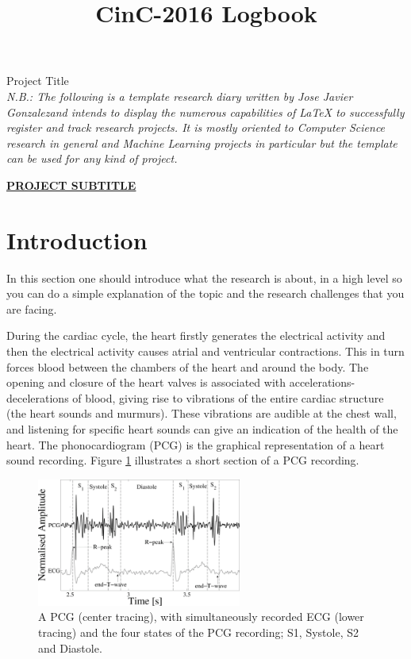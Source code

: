 \documentclass[11pt,letterpaper]{article}
\newcommand{\userName}{Jose Javier Gonzalez}
\begin{document}
\title{CinC-2016 Logbook}
\univlogo
{\Huge Project Title}\\[5mm]

\textit{N.B.: The following is a template research diary written by \userName and intends to display the numerous capabilities of LaTeX to successfully register and track research projects. It is mostly oriented to Computer Science research in general and  Machine Learning projects in particular but the template can be used for any kind of project.}

\vspace{1em}
{\large \underline{\textbf{\uppercase{PROJECT SUBTITLE}}}}

\section*{Introduction} %
\label{sec:introduction}
\begin{tip}
In this section one should introduce what the research is about, in a high level so you can do a simple explanation of the topic and the research challenges that you are facing.
\end{tip}

During the cardiac cycle, the heart firstly generates the electrical activity and then the electrical activity causes atrial and ventricular contractions. This in turn forces blood between the chambers of the heart and around the body. The opening and closure of the heart valves is associated with accelerations-decelerations of blood, giving rise to vibrations of the entire cardiac structure (the heart sounds and murmurs). These vibrations are audible at the chest wall, and listening for specific heart sounds can give an indication of the health of the heart. The phonocardiogram (PCG) is the graphical representation of a heart sound recording. Figure \ref{fig:PCG_ECG} illustrates a short section of a PCG recording.

\begin{figure}[h]
    \includegraphics[width=0.6\textwidth]{Images/PCG_ECG}
    \centering
    \caption{A PCG (center tracing), with simultaneously recorded ECG (lower tracing) and the four states of the PCG recording; S1, Systole, S2 and Diastole.}
    \label{fig:PCG_ECG}
\end{figure}
\end{document}
